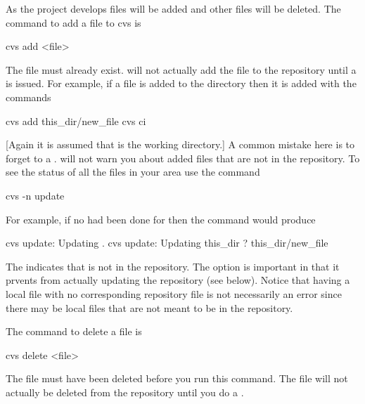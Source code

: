 As the project develops files will be added and other files will be
deleted. The command to add a file to cvs is
\begin{example}
  cvs add <file>
\end{example}
The file must already exist. \cvs will not actually add the file to
the repository until a  is issued. For example, if a file
 is added to the  directory then it is added
with the commands
\begin{example}
  cvs add this_dir/new_file
  cvs ci
\end{example}
[Again it is assumed that  is the working directory.] A common
mistake here is to forget to a .  will not warn
you about added files that are not in the repository. To see the
status of all the files in your area use the command
\begin{example}
  cvs -n update
\end{example}
For example, if no  had been done for  then
the  command would produce
\begin{example}
  cvs update: Updating .
  cvs update: Updating this_dir
  ? this_dir/new_file
\end{example}
The  indicates that  is not in the repository. The
 option is important in that it prvents  from actually
updating the repository (see below). Notice that having a local file
with no corresponding repository file is not necessarily an error
since there may be local files that are not meant to be in the
repository.

The command to delete a file is
\begin{example}
  cvs delete <file>
\end{example}
The file must have been deleted before you run this command. The file
will not actually be deleted from the repository until you do a
.

